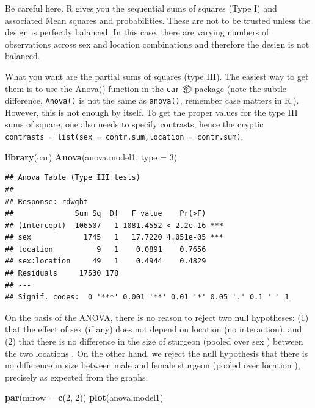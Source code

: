 \documentclass[
  12pt,
]{book}
\makeatletter
\newenvironment{Shaded}{\begin{snugshade}}{\end{snugshade}}
\newcommand{\DataTypeTok}[1]{\textcolor[rgb]{0.13,0.29,0.53}{#1}}
\newcommand{\DecValTok}[1]{\textcolor[rgb]{0.00,0.00,0.81}{#1}}
\newcommand{\KeywordTok}[1]{\textcolor[rgb]{0.13,0.29,0.53}{\textbf{#1}}}
\newcommand{\NormalTok}[1]{#1}
\newenvironment{kframe}{%
\medskip{}
\setlength{\fboxsep}{.8em}
\def\at@end@of@kframe{}%
\ifinner\ifhmode%
 \def\at@end@of@kframe{\end{minipage}}%
 \begin{minipage}{\columnwidth}%
\fi\fi%
\def\FrameCommand##1{\hskip\@totalleftmargin \hskip-\fboxsep
\colorbox{incolor}{##1}\hskip-\fboxsep
    \hskip-\linewidth \hskip-\@totalleftmargin \hskip\columnwidth}%
\MakeFramed {\advance\hsize-\width
  \@totalleftmargin\z@ \linewidth\hsize
  \@setminipage}}%
{\par\unskip\endMakeFramed%
\at@end@of@kframe}
\newenvironment{rmdblock}[1]
 {
 \begin{itemize}
 \renewcommand{\labelitemi}{
   \raisebox{-.7\height}[0pt][0pt]{
     {\setkeys{Gin}{width=3em,keepaspectratio}\texttt{[image: images/\#1]}}
   }
 }
 \begin{kframe}
 \setlength{\fboxsep}{1em}
 \item
 }
 {
 \end{kframe}
 \end{itemize}
 }
\newenvironment{rmdwarning}
  {\begin{rmdblock}{warning}}
  {\end{rmdblock}}
\makeatother
\begin{document}
\begin{rmdwarning}
Be careful here. R gives you the sequential sums of squares (Type I) and associated Mean squares and probabilities. These are not to be trusted unless the design is perfectly balanced. In this case, there are varying numbers of observations across sex and location combinations and therefore the design is not balanced.
\end{rmdwarning}

What you want are the partial sums of squares (type III). The easiest way to get them is to use the Anova() function in the \texttt{car} 📦 package (note the subtle difference, \texttt{Anova()} is not the same as \texttt{anova()}, remember case matters in R.). However, this is not enough by itself. To get the proper values for the type III sums of square, one also needs to specify contrasts, hence the cryptic \texttt{contrasts\ =\ list(sex\ =\ contr.sum,location\ =\ contr.sum)}.

\begin{Shaded}
\begin{Highlighting}[]
\KeywordTok{library}\NormalTok{(car)}
\KeywordTok{Anova}\NormalTok{(anova.model1, }\DataTypeTok{type =} \DecValTok{3}\NormalTok{)}
\end{Highlighting}
\end{Shaded}

\begin{verbatim}
## Anova Table (Type III tests)
## 
## Response: rdwght
##              Sum Sq  Df   F value    Pr(>F)    
## (Intercept)  106507   1 1081.4552 < 2.2e-16 ***
## sex            1745   1   17.7220 4.051e-05 ***
## location          9   1    0.0891    0.7656    
## sex:location     49   1    0.4944    0.4829    
## Residuals     17530 178                        
## ---
## Signif. codes:  0 '***' 0.001 '**' 0.01 '*' 0.05 '.' 0.1 ' ' 1
\end{verbatim}

On the basis of the ANOVA, there is no reason to reject two null hypotheses: (1) that the effect of sex (if any) does not depend on location (no interaction), and (2) that there is no difference in the size of sturgeon (pooled over sex ) between the two locations . On the other hand, we reject the null hypothesis that there is no difference in size between male and female sturgeon (pooled over location ), precisely as expected from the graphs.

\begin{Shaded}
\begin{Highlighting}[]
\KeywordTok{par}\NormalTok{(}\DataTypeTok{mfrow =} \KeywordTok{c}\NormalTok{(}\DecValTok{2}\NormalTok{, }\DecValTok{2}\NormalTok{))}
\KeywordTok{plot}\NormalTok{(anova.model1)}
\end{Highlighting}
\end{Shaded}
\end{document}
